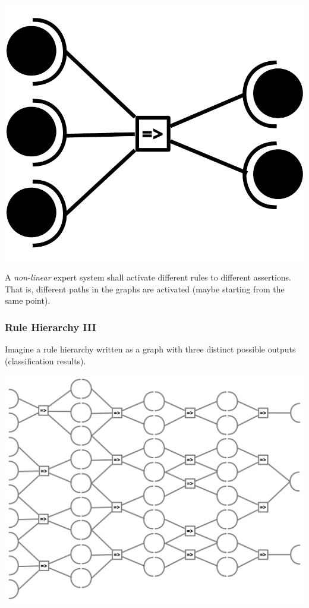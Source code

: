 \documentclass[xcolor={usenames,dvipsnames,svgnames}, compress]{beamer}
\begin{document}
\begin{frame}
\begin{center}
\begin{minipage}{0.33\linewidth}
      \includegraphics[width=0.7\linewidth]{Figures/rules-III}
    \end{minipage}
  \end{center}

  A \emph{non-linear} expert system shall activate different rules to
  different assertions. That is, different paths in the graphs are
  activated (maybe starting from the same point).
\end{frame}

\begin{frame}
  \frametitle{Rule Hierarchy III}
  Imagine a rule hierarchy written as a graph with three distinct
  possible outputs (classification results).
  \begin{center}
    \includegraphics[width=0.7\linewidth]{Figures/rulesact}
  \end{center}
\end{frame}
\end{document}
